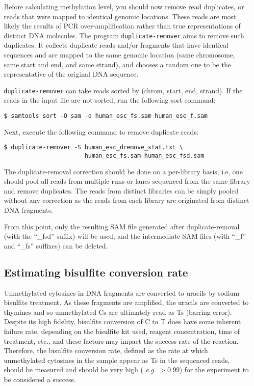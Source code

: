 \documentclass[10pt]{article}
\newcommand{\prog}[1]{\texttt{#1}}
\begin{document}
Before calculating methylation level, you should now remove read
duplicates, or reads that were mapped to identical genomic
locations. These reads are most likely the results of PCR
over-amplification rather than true representations of distinct DNA
molecules. The program \prog{duplicate-remover} aims to remove such
duplicates. It collects duplicate reads and/or fragments that have
identical sequences and are mapped to the same genomic location (same
chromosome, same start and end, and same strand), and chooses a random
one to be the representative of the original DNA sequence.

\prog{duplicate-remover} can take reads sorted by (chrom, start, end,
strand). If the reads in the input file are not sorted, run the
following sort command:

\begin{verbatim}
$ samtools sort -O sam -o human_esc_fs.sam human_esc_f.sam
\end{verbatim}

Next, execute the following command to remove duplicate reads:

\begin{verbatim}
$ duplicate-remover -S human_esc_dremove_stat.txt \
                       human_esc_fs.sam human_esc_fsd.sam
\end{verbatim}

The duplicate-removal correction should be done on a per-library
basis, i.e, one should pool all reads from multiple runs or lanes
sequenced from the same library and remove duplicates. The reads from
distinct libraries can be simply pooled without any correction as the
reads from each library are originated from distinct DNA
fragments.

From this point, only the resulting SAM file generated after
duplicate-removal (with the ``\_fsd'' suffix) will be used, and the
intermediate SAM files (with ``\_f'' and ``\_fs'' suffixes) can be
deleted. 

\subsection{Estimating bisulfite conversion rate}
\label{sec:estim-busilf-conv}

Unmethylated cytosines in DNA fragments are converted to uracils by
sodium bisulfite treatment. As these fragments are amplified, the
uracils are converted to thymines and so unmethylated Cs are
ultimately read as Ts (barring error). Despite its high fidelity,
bisulfite conversion of C to T does have some inherent failure rate,
depending on the bisulfite kit used, reagent concentration, time of
treatment, etc., and these factors may impact the success rate of the
reaction. Therefore, the bisulfite conversion rate, defined as the
rate at which unmethylated cytosines in the sample appear as Ts in the
sequenced reads, should be measured and should be very high ({\em
e.g.} $>0.99$) for the experiment to be considered a success.
\end{document}
